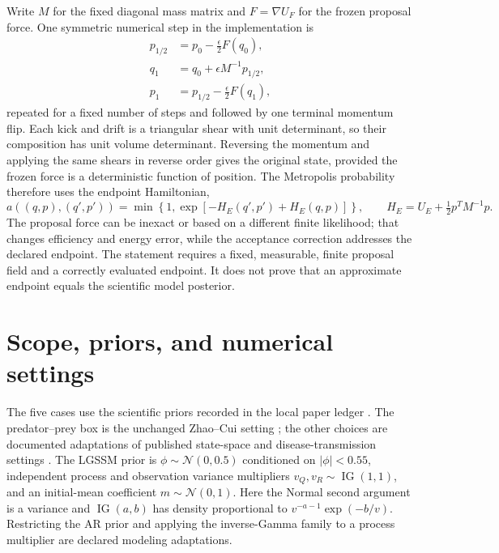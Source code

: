 Write $M$ for the fixed diagonal mass matrix and $F=\nabla U_F$ for the frozen
proposal force.  One symmetric numerical step in the implementation is
\begin{align}
 p_{1/2}&=p_0-\tfrac{\epsilon}{2}F(q_0),\\
 q_1&=q_0+\epsilon M^{-1}p_{1/2},\\
 p_1&=p_{1/2}-\tfrac{\epsilon}{2}F(q_1),
 \end{align}
repeated for a fixed number of steps and followed by one terminal momentum
flip.  Each kick and drift is a triangular shear with
unit determinant, so their composition has unit volume determinant.  Reversing
the momentum and applying the same shears in reverse order gives the original
state, provided the frozen force is a deterministic function of position.
The Metropolis probability therefore uses the endpoint Hamiltonian,
\begin{equation}
 a((q,p),(q',p'))=\min\left\{1,
 \exp[-H_E(q',p')+H_E(q,p)]\right\},\qquad
 H_E=U_E+\tfrac12p^TM^{-1}p.
 \label{eq:bf-surrogate-mh-correction}
\end{equation}
The proposal force can be inexact or based on a different finite likelihood;
that changes efficiency and energy error, while the acceptance correction
addresses the declared endpoint.  The statement requires a fixed, measurable,
finite proposal field and a correctly evaluated endpoint.  It does not prove
that an approximate endpoint equals the scientific model posterior.

\section{Scope, priors, and numerical settings}
\label{sec:bf-surrogate-scope}

The five cases use the scientific priors recorded in the local paper ledger
.  The
predator--prey box is the unchanged Zhao--Cui setting
\citep{zhao2024ttsequential}; the other choices are documented adaptations of
published state-space and disease-transmission settings
\citep{dahlin2019particle,sarkka2009recursive,grinsztajn2021bayes,sarkka2013variational}.
The LGSSM prior is $\phi\sim\mathcal N(0,0.5)$ conditioned on
$|\phi|<0.55$, independent process and observation variance multipliers
$v_Q,v_R\sim\operatorname{IG}(1,1)$, and an initial-mean coefficient
$m\sim\mathcal N(0,1)$.  Here the Normal second argument is a variance and
$\operatorname{IG}(a,b)$ has density proportional to
$v^{-a-1}\exp(-b/v)$.  Restricting the AR prior and applying the inverse-Gamma
family to a process multiplier are declared modeling adaptations.

